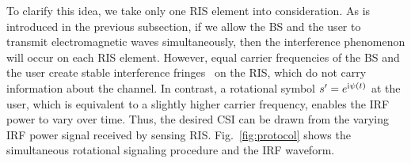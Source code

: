 \documentclass[journal,twocolumn]{IEEEtran}
\theoremstyle{nonumberplain}
\def \ri {{\rm i}}
\begin{document}
    To clarify this idea, we take only one RIS element into consideration. 
    As is introduced in the previous subsection, if we allow the BS and the user to transmit electromagnetic waves simultaneously, then the interference phenomenon will occur on each RIS element. 
    However, equal carrier frequencies of the BS and the user create stable interference fringes~\cite{louradour1993interference} on the RIS, which do not carry information about the channel. 
    In contrast, a rotational symbol $s'=e^{\ri\psi(t)}$ at the user, which is equivalent to a slightly higher carrier frequency, enables the IRF power to vary over time. 
    Thus, the desired CSI can be drawn from the varying IRF power signal received by sensing RIS. 
    Fig.~\ref{fig:protocol} shows the simultaneous rotational signaling procedure and the IRF waveform. 
\end{document}
